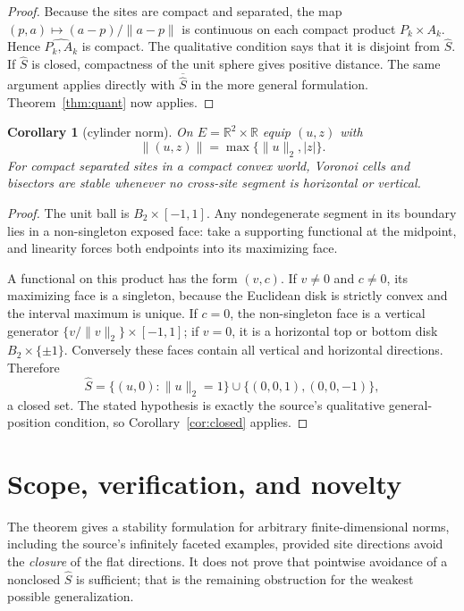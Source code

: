 \documentclass[11pt]{article}
\newtheorem{corollary}[theorem]{Corollary}
\newcommand{\R}{\mathbb R}
\begin{document}
\begin{proof}
Because the sites are compact and separated, the map
$(p,a)\mapsto(a-p)/\|a-p\|$ is continuous on each compact product
$P_k\times A_k$.  Hence $\widehat{P_k,A_k}$ is compact.  The qualitative
condition says that it is disjoint from $\widehat S$.  If $\widehat S$ is
closed, compactness of the unit sphere gives positive distance.  The same
argument applies directly with $\overline{\widehat S}$ in the more general
formulation.  Theorem~\ref{thm:quant} now applies.
\end{proof}

\begin{corollary}[cylinder norm]\label{cor:cylinder}
On $E=\R^2\times\R$ equip $(u,z)$ with
\[
 \|(u,z)\|=\max\{\|u\|_2,|z|\}.
\]
For compact separated sites in a compact convex world, Voronoi cells and
bisectors are stable whenever no cross-site segment is horizontal or vertical.
\end{corollary}

\begin{proof}
The unit ball is $B_2\times[-1,1]$.  Any nondegenerate segment in its boundary
lies in a non-singleton exposed face: take a supporting functional at the
midpoint, and linearity forces both endpoints into its maximizing face.

A functional on this product has the form $(v,c)$.  If $v\neq0$ and $c\neq0$,
its maximizing face is a singleton, because the Euclidean disk is strictly
convex and the interval maximum is unique.  If $c=0$, the non-singleton face
is a vertical generator $\{v/\|v\|_2\}\times[-1,1]$; if $v=0$, it is a
horizontal top or bottom disk $B_2\times\{\pm1\}$.  Conversely these faces
contain all vertical and horizontal directions.  Therefore
\[
 \widehat S=\{(u,0):\|u\|_2=1\}\cup\{(0,0,1),(0,0,-1)\},
\]
a closed set.  The stated hypothesis is exactly the source's qualitative
general-position condition, so Corollary~\ref{cor:closed} applies.
\end{proof}

\section{Scope, verification, and novelty}

The theorem gives a stability formulation for arbitrary finite-dimensional
norms, including the source's infinitely faceted examples, provided site
directions avoid the \emph{closure} of the flat directions.  It does not prove
that pointwise avoidance of a nonclosed $\widehat S$ is sufficient; that is the
remaining obstruction for the weakest possible generalization.
\end{document}

